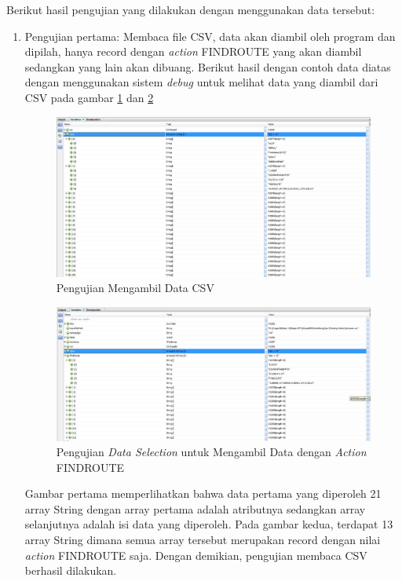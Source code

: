 Berikut hasil pengujian yang dilakukan dengan menggunakan data tersebut:
\begin{enumerate}
	\item Pengujian pertama: Membaca file CSV, data akan diambil oleh program dan dipilah, hanya record dengan \textsl{action} FINDROUTE yang akan diambil sedangkan yang lain akan dibuang. Berikut hasil dengan contoh data diatas dengan menggunakan sistem \textsl{debug} untuk melihat data yang diambil dari CSV pada gambar \ref{fig:Pengujian1} dan \ref{fig:Pengujian12}
	
	\begin{figure}[H]
	\centering
	\includegraphics[scale=0.4]{Gambar/pengujian1.jpg}
	\caption[Pengujian Mengambil Data CSV]{Pengujian Mengambil Data CSV} 
	\label{fig:Pengujian1}
	\end{figure}

	\begin{figure}[H]
	\centering
	\includegraphics[scale=0.4]{Gambar/pengujian12.jpg}
	\caption[Pengujian \textsl{Data Selection} untuk Mengambil Data dengan \textsl{Action} FINDROUTE]{Pengujian \textsl{Data Selection} untuk Mengambil Data dengan \textsl{Action} FINDROUTE} 
	\label{fig:Pengujian12}
	\end{figure}

	Gambar pertama memperlihatkan bahwa data pertama yang diperoleh 21 array String dengan array pertama adalah atributnya sedangkan array selanjutnya adalah isi data yang diperoleh. Pada gambar kedua, terdapat 13 array String dimana semua array tersebut merupakan record dengan nilai \textsl{action} FINDROUTE saja. Dengan demikian, pengujian membaca CSV berhasil dilakukan.


\end{enumerate}
